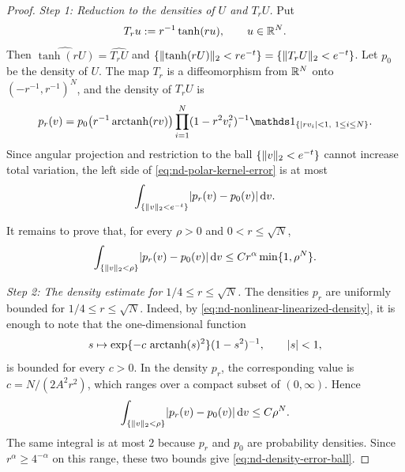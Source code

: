 \documentclass[11pt,reqno,a4paper]{article}
\DeclareMathOperator{\arctanh}{arctanh}
\begin{document}
\begin{proof}
  \emph{Step 1: Reduction to the densities of $U$ and $T_rU$.}
  Put
  \begin{equation*}
    T_r u:=r^{-1}\tanh(ru),
    \qquad u\in\mathbb{R}^N .
  \end{equation*}
  Then
  $\widehat{\tanh(rU)}=\widehat{T_rU}$ and
  $\{\lVert\tanh(rU)\rVert_2<re^{-t}\}=\{\lVert T_rU\rVert_2<e^{-t}\}$. Let
  $p_0$ be the density of $U$. The map $T_r$ is a diffeomorphism from
  $\mathbb{R}^N$ onto $(-r^{-1},r^{-1})^N$, and the density of $T_rU$ is
  \begin{equation}\label{eq:nd-nonlinear-linearized-density}
    p_r(v)
    =
    p_0\left(r^{-1}\arctanh(rv)\right)
    \prod_{i=1}^N(1-r^2v_i^2)^{-1}
    \one_{\{\abs{rv_i}<1,\ 1\leq i\leq N\}} .
  \end{equation}
  Since angular projection and restriction to the ball
  $\{\lVert v\rVert_2<e^{-t}\}$ cannot increase total variation, the left side of
  \cref{eq:nd-polar-kernel-error} is at most
  \begin{equation}\label{eq:nd-density-error-reduction}
    \int_{\{\norm v_2<e^{-t}\}}\abs{p_r(v)-p_0(v)}\,\mathrm{d}v .
  \end{equation}

  It remains to prove that, for every $\rho>0$ and $0<r\leq\sqrt N$,
  \begin{equation}\label{eq:nd-density-error-ball}
    \int_{\{\norm v_2<\rho\}}\abs{p_r(v)-p_0(v)}\,\mathrm{d}v
    \leq
    C r^\alpha \min\{1,\rho^N\}.
  \end{equation}

  \emph{Step 2: The density estimate for $1/4\leq r\leq\sqrt N$.}
  The densities $p_r$ are uniformly bounded for
  $1/4\leq r\leq\sqrt N$. Indeed, by
  \cref{eq:nd-nonlinear-linearized-density}, it is enough to note that the
  one-dimensional function
  \begin{equation*}
    s\mapsto
    \exp\{-c\,\arctanh(s)^2\}(1-s^2)^{-1},
    \qquad \abs{s}<1,
  \end{equation*}
  is bounded for every $c>0$. In the density $p_r$, the corresponding value is
  $c=N/(2A^2r^2)$, which ranges over a compact subset of $(0,\infty)$. Hence
  \begin{equation*}
    \int_{\{\norm v_2<\rho\}}\abs{p_r(v)-p_0(v)}\,\mathrm{d}v
    \leq C\rho^N .
  \end{equation*}
  The same integral is at most $2$ because $p_r$ and $p_0$ are probability
  densities. Since $r^\alpha\geq4^{-\alpha}$ on this range, these two bounds
  give \cref{eq:nd-density-error-ball}.


\end{proof}
\end{document}
